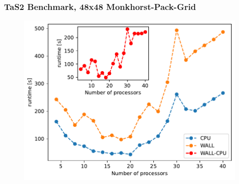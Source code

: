 \documentclass{beamer}
\begin{document}
\begin{frame}
    \frametitle{TaS2 Benchmark, 48x48 Monkhorst-Pack-Grid}
    \begin{figure}
        \includegraphics[width=\linewidth, height=\textheight,keepaspectratio]{TaS2_bench_nprocs_24x24.pdf}
    \end{figure}
\end{frame}
\end{document}
